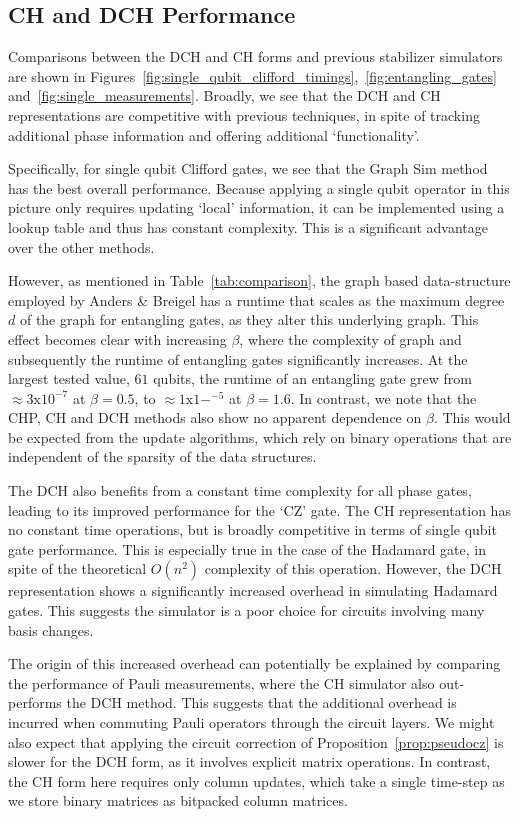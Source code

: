 \subsection*{CH and DCH Performance}
Comparisons between the DCH and CH forms and previous stabilizer simulators are shown in Figures~\ref{fig:single_qubit_clifford_timings},~\ref{fig:entangling_gates} and~\ref{fig:single_measurements}. Broadly, we see that the DCH and CH representations are competitive with previous techniques, in spite of tracking additional phase information and offering additional `functionality'.\par
Specifically, for single qubit Clifford gates, we see that the Graph Sim method has the best overall performance. Because applying a single qubit operator in this picture only requires updating `local' information, it can be implemented using a lookup table and thus has constant complexity. This is a significant advantage over the other methods.\par
However, as mentioned in Table~\ref{tab:comparison}, the graph based data-structure employed by Anders \& Breigel has a runtime that scales as the maximum degree $d$ of the graph for entangling gates, as they alter this underlying graph. This effect becomes clear with increasing $\beta$, where the complexity of graph and subsequently the runtime of entangling gates significantly increases. At the largest tested value, $61$ qubits, the runtime of an entangling gate grew from $\approx 3\mathrm{x}10^{-7}$ at $\beta=0.5$, to $\approx 1\mathrm{x}1-^{-5}$ at $\beta=1.6$. In contrast, we note that the CHP, CH and DCH methods also show no apparent dependence on $\beta$. This would be expected from the update algorithms, which rely on binary operations that are independent of the sparsity of the data structures.\par
The DCH also benefits from a constant time complexity for all phase gates, leading to its improved performance for the `CZ' gate. The CH representation has no constant time operations, but is broadly competitive in terms of single qubit gate performance. This is especially true in the case of the Hadamard gate, in spite of the theoretical $O(n^{2})$ complexity of this operation. However, the DCH representation shows a significantly increased overhead in simulating Hadamard gates. This suggests the simulator is a poor choice for circuits involving many basis changes.\par
The origin of this increased overhead can potentially be explained by comparing the performance of Pauli measurements, where the CH simulator also out-performs the DCH method. This suggests that the additional overhead is incurred when commuting Pauli operators through the circuit layers. We might also expect that applying the circuit correction of Proposition~\ref{prop:pseudocz} is slower for the DCH form, as it involves explicit matrix operations. In contrast, the CH form here requires only column updates, which take a single time-step as we store binary matrices as bitpacked column matrices.\par
